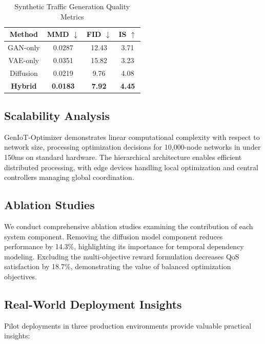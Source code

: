 \documentclass[conference]{IEEEtran}
\begin{document}
\begin{table}[htbp]
\caption{Synthetic Traffic Generation Quality Metrics}
\begin{center}
\begin{tabular}{|c|c|c|c|}
\hline
\textbf{Method} & \textbf{MMD} $\downarrow$ & \textbf{FID} $\downarrow$ & \textbf{IS} $\uparrow$ \\
\hline
GAN-only & 0.0287 & 12.43 & 3.71 \\
\hline
VAE-only & 0.0351 & 15.82 & 3.23 \\
\hline
Diffusion & 0.0219 & 9.76 & 4.08 \\
\hline
\textbf{Hybrid} & \textbf{0.0183} & \textbf{7.92} & \textbf{4.45} \\
\hline
\end{tabular}
\label{tab:generation}
\end{center}
\end{table}

\subsection{Scalability Analysis}

GenIoT-Optimizer demonstrates linear computational complexity with respect to network size, processing optimization decisions for 10,000-node networks in under 150ms on standard hardware. The hierarchical architecture enables efficient distributed processing, with edge devices handling local optimization and central controllers managing global coordination.

\subsection{Ablation Studies}

We conduct comprehensive ablation studies examining the contribution of each system component. Removing the diffusion model component reduces performance by 14.3\%, highlighting its importance for temporal dependency modeling. Excluding the multi-objective reward formulation decreases QoS satisfaction by 18.7\%, demonstrating the value of balanced optimization objectives.

\subsection{Real-World Deployment Insights}

Pilot deployments in three production environments provide valuable practical insights:
\end{document}
